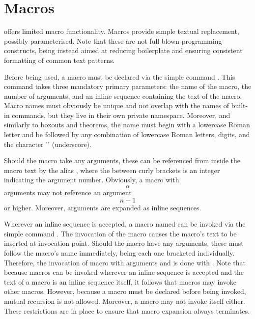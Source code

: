 \section[sec:macros]{Macros}

\lambtex offers limited macro functionality.  Macros provide simple textual replacement,
possibly parameterised.  Note that these are not full-blown programming constructs,
being instead aimed at reducing boilerplate and ensuring consistent formatting of
common text patterns.

Before being used, a macro must be declared via the simple command \mono{\\newmacro}.
This command takes three mandatory primary parameters: the name of the macro, the number
of arguments, and an inline sequence containing the text of the macro.  Macro names
must obviously be unique and not overlap with the names of built-in commands, but they
live in their own private namespace.  Moreover, and similarly to boxouts and theorems,
the name must begin with a lowercase Roman letter and be followed by any combination
of lowercase Roman letters, digits, and the character '\mono{_}' (underscore).

Should the macro take any arguments, these can be referenced from inside the macro
text by the alias , where the  between curly
brackets is an integer indicating the argument number.  Obviously, a macro with $$n$$
arguments may not reference an argument $$n+1$$ or higher.  Moreover, arguments are
expanded as inline sequences.

Wherever an inline sequence is accepted, a macro named  can be invoked via
the simple command \mono{\\name}.  The invocation of the macro causes the macro's text
to be inserted at invocation point.  Should the macro have any arguments, these must
follow the macro's name immediately, being each one bracketed individually.  Therefore,
the invocation of macro  with arguments  and 
is done with \mbox{}.  Note that because macros
can be invoked wherever an inline sequence is accepted and the text of a macro is
an inline sequence itself, it follows that macros may invoke other macros.  However,
because a macro must be declared before being invoked, mutual recursion is not allowed.
Moreover, a macro may not invoke itself either.  These restrictions are in place to
ensure that macro expansion always terminates.

